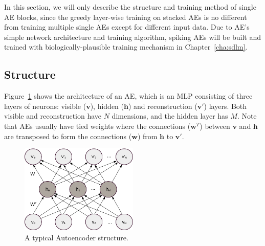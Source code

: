In this section, we will only describe the structure and training method of single AE blocks, since the greedy layer-wise training on stacked AEs is no different from training multiple single AEs except for different input data.
Due to \protect{} AE's simple network architecture and training algorithm, spiking AEs will be built and trained with \protect{} biologically-plausible training mechanism in Chapter~\ref{cha:sdlm}.

\subsection{Structure}
Figure~\ref{fig:AE} shows the architecture of an AE, which is an MLP consisting of three layers of neurons: \protect{} visible ($\mathbf{v}$), hidden ($\mathbf{h}$) and reconstruction ($\mathbf{v'}$) layers.
Both visible and reconstruction \protect{} \protect{} have $N$ dimensions, and the hidden layer has $M$.
Note that AEs usually have tied weights where the connections ($\mathbf{w}^T$) between $\mathbf{v}$ and $\mathbf{h}$ are transposed to form the connections ($\mathbf{w}$) from $\mathbf{h}$ to $\mathbf{v'}$.


\begin{figure}
	\centering
	\includegraphics[width=0.5\textwidth]{pics_sdlm/AE.pdf}
	\caption{A typical Autoencoder structure.}
	\label{fig:AE}
\end{figure}


